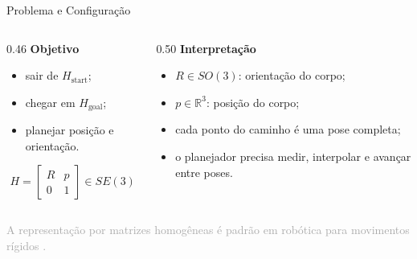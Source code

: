 \documentclass[aspectratio=169]{beamer}
\newcommand{\smalltag}[1]{\textcolor{darkgray}{\scriptsize #1}}
\begin{document}
\begin{frame}{Problema e Configuração}
    \begin{columns}[T]
        \begin{column}{0.46\textwidth}
            \textbf{Objetivo}
            \begin{itemize}
                \item sair de \(H_{\mathrm{start}}\);
                \item chegar em \(H_{\mathrm{goal}}\);
                \item planejar posição e orientação.
            \end{itemize}

            \vspace{0.2cm}
            \[
            H =
            \begin{bmatrix}
            R & p \\
            0 & 1
            \end{bmatrix}
            \in SE(3)
            \]
        \end{column}
        \begin{column}{0.50\textwidth}
            \textbf{Interpretação}
            \begin{itemize}
                \item \(R \in SO(3)\): orientação do corpo;
                \item \(p \in \mathbb{R}^3\): posição do corpo;
                \item cada ponto do caminho é uma pose completa;
                \item o planejador precisa medir, interpolar e avançar entre poses.
            \end{itemize}
        \end{column}
    \end{columns}

    \vspace{0.35cm}
    \smalltag{A representação por matrizes homogêneas é padrão em robótica para movimentos rígidos \cite{Murray1994,LynchPark2017}.}
\end{frame}
\end{document}
